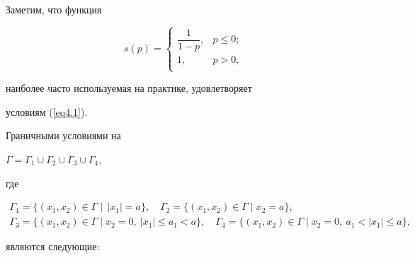 Заметим, что функция


$$


s(p)=


\begin{cases}


\dfrac{1}{1-p}, & p \leq 0; \\[2mm]


1, & p>0, \\


\end{cases}


$$


наиболее часто используемая на практике, удовлетворяет


условиям (\ref{eq4.1}).





Граничными условиями на


$\Gamma = \Gamma_{1} \cup \Gamma_{2} \cup \Gamma_{3} \cup\Gamma_{4}$,


где


\begin{gather*}


\Gamma_{1} = \{(x_{1},x_{2}) \in \Gamma \mid


\, |x_{1}|= a \} ,\quad


\Gamma_{2} = \{(x_{1},x_{2}) \in \Gamma \mid x_{2} = a \} ,\\


\Gamma_{3} = \{(x_{1},x_{2}) \in \Gamma \mid x_{2} = 0,


\ |x_{1}| \leq a_{1} < a \} ,\quad


\Gamma_{4} = \{(x_{1},x_{2}) \in \Gamma \mid x_{2} = 0,


\ a_{1} < |x_{1}|\leq a \},


\end{gather*}


являются следующие:


